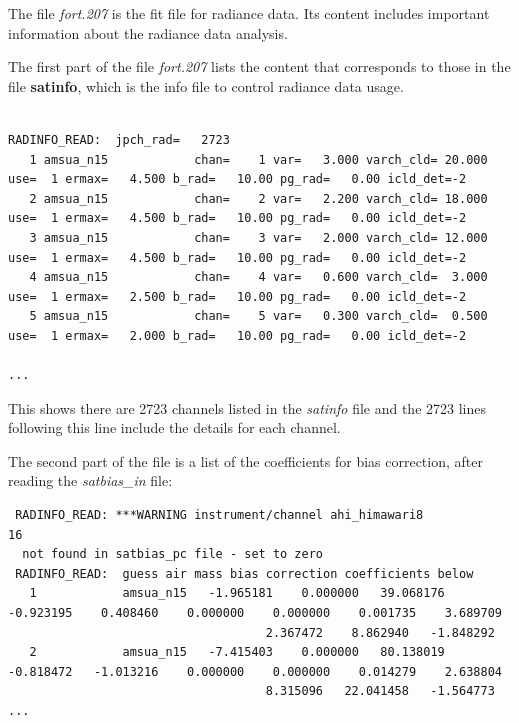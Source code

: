 The file \textit{fort.207} is the fit file for radiance data. Its content includes important information about the radiance data analysis.

The first part of the file \textit{fort.207} lists the content that corresponds to those in the file \textbf{satinfo}, which is the info file to control radiance data usage. 

\begin{tiny}
\begin{verbatim}

RADINFO_READ:  jpch_rad=   2723
   1 amsua_n15            chan=    1 var=   3.000 varch_cld= 20.000 use=  1 ermax=   4.500 b_rad=   10.00 pg_rad=   0.00 icld_det=-2
   2 amsua_n15            chan=    2 var=   2.200 varch_cld= 18.000 use=  1 ermax=   4.500 b_rad=   10.00 pg_rad=   0.00 icld_det=-2
   3 amsua_n15            chan=    3 var=   2.000 varch_cld= 12.000 use=  1 ermax=   4.500 b_rad=   10.00 pg_rad=   0.00 icld_det=-2
   4 amsua_n15            chan=    4 var=   0.600 varch_cld=  3.000 use=  1 ermax=   2.500 b_rad=   10.00 pg_rad=   0.00 icld_det=-2
   5 amsua_n15            chan=    5 var=   0.300 varch_cld=  0.500 use=  1 ermax=   2.000 b_rad=   10.00 pg_rad=   0.00 icld_det=-2

...
\end{verbatim}
\end{tiny}

This shows there are 2723 channels listed in the \textit{satinfo} file and the 2723 lines following this line include the details for each channel.

The second part of the file is a list of the coefficients for bias correction, after reading the \textit{satbias\_in} file:

\begin{tiny}
\begin{verbatim}
 RADINFO_READ: ***WARNING instrument/channel ahi_himawari8                 16
  not found in satbias_pc file - set to zero
 RADINFO_READ:  guess air mass bias correction coefficients below
   1            amsua_n15   -1.965181    0.000000   39.068176   -0.923195    0.408460    0.000000    0.000000    0.001735    3.689709    
                                    2.367472    8.862940   -1.848292
   2            amsua_n15   -7.415403    0.000000   80.138019   -0.818472   -1.013216    0.000000    0.000000    0.014279    2.638804    
                                    8.315096   22.041458   -1.564773
...
\end{verbatim}
\end{tiny}


